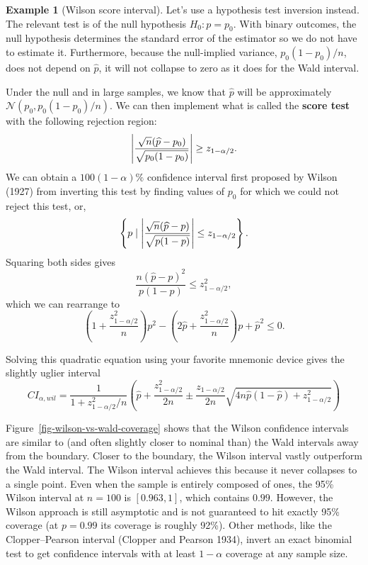 \documentclass[
  13pt,
  letterpaper,
  DIV=11,
  numbers=noendperiod]{scrreprt}
\newcommand{\N}{\mathcal{N}}
\DeclarePairedDelimiter{\abs}{\lvert}{\rvert}
\theoremstyle{plain}
\theoremstyle{plain}
\theoremstyle{definition}
\theoremstyle{definition}
\newtheorem{example}{Example}[chapter]
\theoremstyle{remark}
\begin{document}
\begin{example}[Wilson score
interval]
Let's use a hypothesis test inversion instead. The relevant test is of
the null hypothesis \(H_0: p = p_0\). With binary outcomes, the null
hypothesis determines the standard error of the estimator so we do not
have to estimate it. Furthermore, because the null-implied variance,
\(p_0(1 - p_0) / n\), does not depend on \(\widehat{p}\), it will not
collapse to zero as it does for the Wald interval.

Under the null and in large samples, we know that \(\widehat{p}\) will
be approximately \(\N(p_0, p_0(1-p_0)/n)\). We can then implement what
is called the \textbf{score test} with the following rejection region:
\[
\abs*{\frac{\sqrt{n}(\widehat{p} - p_0)}{\sqrt{p_0(1-p_0)}}} \geq z_{1-\alpha/2}.
\] We can obtain a \(100(1-\alpha)\%\) confidence interval first
proposed by Wilson (1927) from inverting this test by finding values of
\(p_0\) for which we could not reject this test, or, \[
\left\{p \mid \abs*{\frac{\sqrt{n}(\widehat{p} - p)}{\sqrt{p(1-p)}}} \leq z_{1-\alpha/2}\right\}.
\] Squaring both sides gives \[
\frac{n(\widehat{p}-p)^2}{p(1-p)} \leq z^2_{1-\alpha/2}, 
\] which we can rearrange to \[
\left(1 + \frac{z^2_{1-\alpha/2}}{n}\right)p^2 - \left(2\widehat{p} + \frac{z^2_{1-\alpha/2}}{n}\right)p + \widehat{p}^2 \leq 0.
\]

Solving this quadratic equation using your favorite mnemonic device
gives the slightly uglier interval \[
CI_{\alpha, wil} = \frac{1}{1 + z^2_{1-\alpha/2}/n}\left(\widehat{p} + \frac{z^2_{1-\alpha/2}}{2n} \pm \frac{z_{1-\alpha/2}}{2n} \sqrt{4n\widehat{p}(1-\widehat{p}) + z^2_{1-\alpha/2}}\right)
\]

Figure~\ref{fig-wilson-vs-wald-coverage} shows that the Wilson
confidence intervals are similar to (and often slightly closer to
nominal than) the Wald intervals away from the boundary. Closer to the
boundary, the Wilson interval vastly outperform the Wald interval. The
Wilson interval achieves this because it never collapses to a single
point. Even when the sample is entirely composed of ones, the 95\%
Wilson interval at \(n = 100\) is \([0.963, 1]\), which contains
\(0.99\). However, the Wilson approach is still asymptotic and is not
guaranteed to hit exactly 95\% coverage (at \(p=0.99\) its coverage is
roughly 92\%). Other methods, like the Clopper--Pearson interval
(Clopper and Pearson 1934), invert an exact binomial test to get
confidence intervals with at least \(1-\alpha\) coverage at any sample
size.

\end{example}
\end{document}
